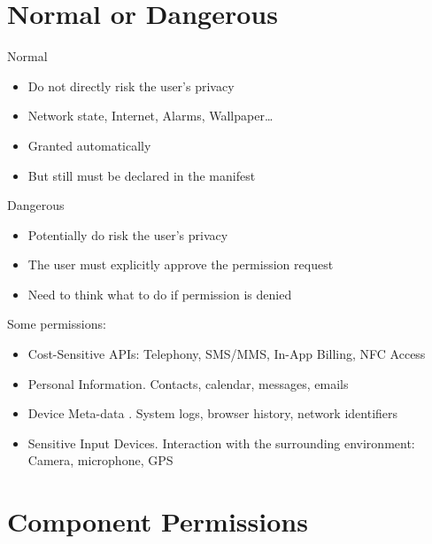 \documentclass{article}
\begin{document}
\section{Normal or Dangerous}
\begin{flushleft}
Normal
\begin{itemize}
  \item Do not directly risk the user’s privacy 
  \item Network state, Internet, Alarms, Wallpaper… 
  \item Granted automatically 
  \item But still must be declared in the manifest
\end{itemize}
Dangerous
\begin{itemize}
  \item Potentially do risk the user’s privacy 
  \item The user must explicitly approve the permission request 
  \item Need to think what to do if permission is denied
\end{itemize}
Some permissions:
\begin{itemize}
  \item Cost-Sensitive APIs: Telephony, SMS/MMS, In-App Billing, NFC Access
  \item Personal Information. Contacts, calendar, messages, emails 
  \item Device Meta-data . System logs, browser history, network identifiers 
  \item Sensitive Input Devices. Interaction with the surrounding environment: Camera, microphone, GPS
\end{itemize}
\end{flushleft}

\newpage

\section{Component Permissions}
\end{document}
